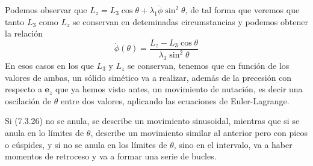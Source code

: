 Podemos observar que $L_z = L_3 \cos\theta + \lambda_1 \dot{\phi} \sin^2\theta$, de tal forma que veremos que tanto $L_3$ como $L_z$ se conservan en deteminadas circumstancias y podemos obtener la relación
\begin{equation} \label{6.1.1}
    \dot{\phi}(\theta) = \frac{L_z - L_3 \cos\theta}{\lambda_1\sin^2\theta}
\end{equation}
En esos casos en los que $L_3$ y $L_z$ se conservan, tenemos que en función de los valores de ambas, un sólido simético va a realizar, además de la precesión con respecto a $\mathbf{e}_z$ que ya hemos visto antes, un movimiento de nutación, es decir una oscilación de $\theta$ entre dos valores, aplicando las ecuaciones de Euler-Lagrange.

Si (7.3.26) no se anula, se describe un movimiento sinusoidal, mientras que si se anula en lo límites de $\theta$, describe un movimiento similar al anterior pero con picos o cúspides, y si no se anula en los límites de $\theta$, sino en el intervalo, va a haber momentos de retroceso y va a formar una serie de bucles.
